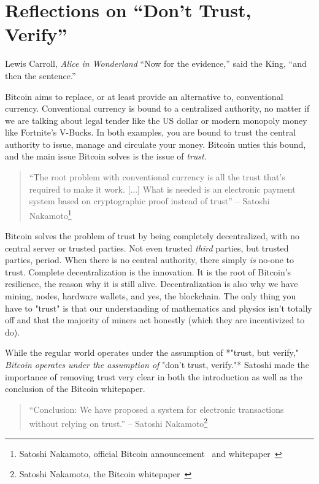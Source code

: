 \chapter{Reflections on ``Don't Trust, Verify''}
\label{les:16}

\begin{chapquote}{Lewis Carroll, \textit{Alice in Wonderland}}
``Now for the evidence,'' said the King, ``and then the sentence.''
\end{chapquote}

Bitcoin aims to replace, or at least provide an alternative to,
conventional currency. Conventional currency is bound to a centralized
authority, no matter if we are talking about legal tender like the US
dollar or modern monopoly money like Fortnite's V-Bucks. In both
examples, you are bound to trust the central authority to issue, manage
and circulate your money. Bitcoin unties this bound, and the main issue
Bitcoin solves is the issue of \textit{trust}.

\begin{quotation}
``The root problem with conventional currency is all the trust that's
required to make it work. [...] What is needed is an electronic
payment system based on cryptographic proof instead of trust''
\flushright -- Satoshi Nakamoto\footnote{Satoshi Nakamoto, official Bitcoin announcement~\cite{bitcoin-announcement} and whitepaper~\cite{whitepaper}}
\end{quotation}

Bitcoin solves the problem of trust by being completely decentralized,
with no central server or trusted parties. Not even trusted \textit{third}
parties, but trusted parties, period. When there is no central
authority, there simply \textit{is} no-one to trust. Complete decentralization
is the innovation. It is the root of Bitcoin's resilience, the reason
why it is still alive. Decentralization is also why we have mining,
nodes, hardware wallets, and yes, the blockchain. The only thing you
have to "trust" is that our understanding of mathematics and physics
isn't totally off and that the majority of miners act honestly (which
they are incentivized to do).

While the regular world operates under the assumption of *"trust, but
verify,"\textit{ Bitcoin operates under the assumption of }"don't trust,
verify."* Satoshi made the importance of removing trust very clear in
both the introduction as well as the conclusion of the Bitcoin
whitepaper.

\begin{quotation}
``Conclusion: We have proposed a system for electronic transactions
without relying on trust.''
\flushright -- Satoshi Nakamoto\footnote{Satoshi Nakamoto, the Bitcoin whitepaper~\cite{whitepaper}}
\end{quotation}


